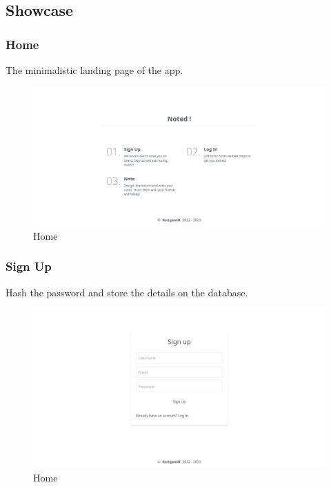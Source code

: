 \documentclass[
]{article}
\begin{document}
\hypertarget{showcase}{%
  \pagebreak
  \subsection{Showcase}\label{showcase}
}

\hypertarget{home}{%
  \subsubsection{Home}\label{home}
  The minimalistic landing page of the app.
}

\begin{figure}[!h]
  \centering
  \includegraphics{../.github/images/home.png}
  \caption{Home}
\end{figure}

\hypertarget{sign-up}{
  \subsubsection{Sign Up}\label{sign-up}
  Hash the password and store the details on the database.
}

\begin{figure}[!h]
  \centering
  \includegraphics{../.github/images/signup.png}
  \caption{Home}
\end{figure}
\end{document}
